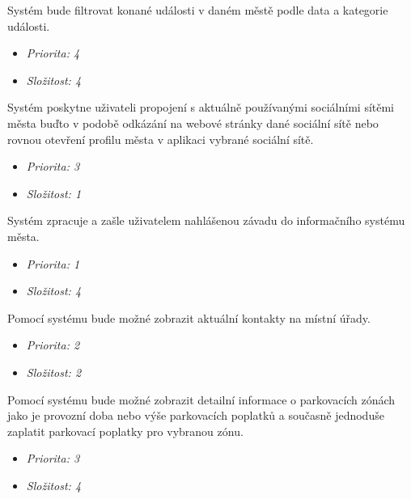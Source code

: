 
Systém bude filtrovat konané události v daném městě podle data a kategorie události.

\begin{itemize}
  \item \textit{Priorita: 4}
  \item \textit{Složitost: 4}
\end{itemize}

Systém poskytne uživateli propojení s aktuálně používanými sociálními sítěmi města buďto v podobě odkázání na webové stránky 
dané sociální sítě nebo rovnou otevření profilu města v aplikaci vybrané sociální sítě.  

\begin{itemize}
  \item \textit{Priorita: 3}
  \item \textit{Složitost: 1}
\end{itemize}

Systém zpracuje a zašle uživatelem nahlášenou závadu do informačního systému města.

\begin{itemize}
  \item \textit{Priorita: 1}
  \item \textit{Složitost: 4}
\end{itemize}

Pomocí systému bude možné zobrazit aktuální kontakty na místní úřady.

\begin{itemize}
  \item \textit{Priorita: 2}
  \item \textit{Složitost: 2}
\end{itemize}

Pomocí systému bude možné zobrazit detailní informace o parkovacích zónách jako je provozní doba nebo výše parkovacích poplatků a současně jednoduše zaplatit parkovací poplatky pro vybranou zónu.
\begin{itemize}
  \item \textit{Priorita: 3}
  \item \textit{Složitost: 4}
\end{itemize}

